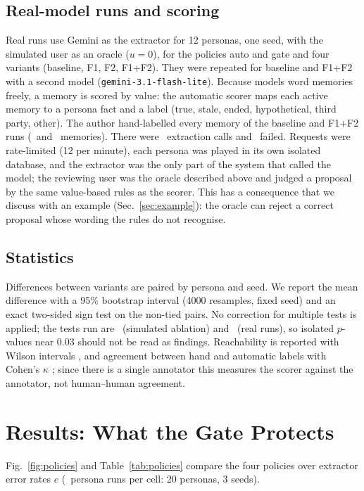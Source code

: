 \IfFileExists{IEEEtran.cls}{\documentclass[journal]{IEEEtran}\def\HAVEIEEE{1}}{\documentclass[10pt,twocolumn]{article}\usepackage[margin=0.7in,columnsep=0.25in]{geometry}}
\begin{document}
\subsection{Real-model runs and scoring}
Real runs use Gemini as the extractor for 12 personas, one seed, with the simulated user as an oracle ($u=0$), for the policies auto and gate and four variants (baseline, F1, F2, F1+F2). They were repeated for baseline and F1+F2 with a second model (\texttt{gemini-3.1-flash-lite}). Because models word memories freely, a memory is scored by value: the automatic scorer maps each active memory to a persona fact and a label (true, stale, ended, hypothetical, third party, other). The author hand-labelled every memory of the baseline and F1+F2 runs (\agrBaseN\ and \agrBothN\ memories). There were \realExtractions\ extraction calls and \realExtractionErrors\ failed. Requests were rate-limited (12 per minute), each persona was played in its own isolated database, and the extractor was the only part of the system that called the model; the reviewing user was the oracle described above and judged a proposal by the same value-based rules as the scorer. This has a consequence that we discuss with an example (Sec.~\ref{sec:example}): the oracle can reject a correct proposal whose wording the rules do not recognise.

\subsection{Statistics}
Differences between variants are paired by persona and seed. We report the mean difference with a 95\% bootstrap interval (4000 resamples, fixed seed) and an exact two-sided sign test on the non-tied pairs. No correction for multiple tests is applied; the tests run are \simTests\ (simulated ablation) and \realTests\ (real runs), so isolated $p$-values near 0.03 should not be read as findings. Reachability is reported with Wilson intervals \cite{wilson1927}, and agreement between hand and automatic labels with Cohen's $\kappa$ \cite{cohen1960}; since there is a single annotator this measures the scorer against the annotator, not human--human agreement.

\section{Results: What the Gate Protects}
\label{sec:policies}
Fig.~\ref{fig:policies} and Table~\ref{tab:policies} compare the four policies over extractor error rates $e$ (\simN\ persona runs per cell: 20 personas, 3 seeds).
\end{document}
